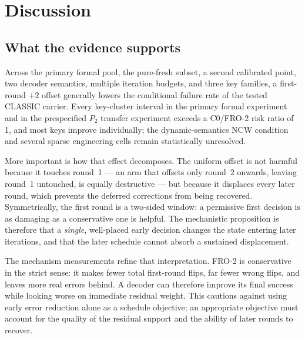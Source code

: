 \documentclass[lettersize,journal]{IEEEtran}
\begin{document}
\section{Discussion}\label{sec:discussion}

\subsection{What the evidence supports}

Across the primary formal pool, the pure-fresh subset, a second calibrated point, two decoder semantics, multiple iteration budgets, and three key families, a first-round $+2$ offset generally lowers the conditional failure rate of the tested CLASSIC carrier. Every key-cluster interval in the primary formal experiment and in the prespecified $P_2$ transfer experiment exceeds a C0/FRO-2 risk ratio of 1, and most keys improve individually; the dynamic-semantics NCW condition and several sparse engineering cells remain statistically unresolved.

More important is how that effect decomposes. The uniform offset is not harmful because it touches round~1 --- an arm that offsets only round~2 onwards, leaving round~1 untouched, is equally destructive --- but because it displaces every later round, which prevents the deferred corrections from being recovered. Symmetrically, the first round is a two-sided window: a permissive first decision is as damaging as a conservative one is helpful. The mechanistic proposition is therefore that a \emph{single}, well-placed early decision changes the state entering later iterations, and that the later schedule cannot absorb a sustained displacement.

The mechanism measurements refine that interpretation. FRO-2 is conservative in the strict sense: it makes fewer total first-round flips, far fewer wrong flips, and leaves more real errors behind. A decoder can therefore improve its final success while looking worse on immediate residual weight. This cautions against using early error reduction alone as a schedule objective; an appropriate objective must account for the quality of the residual support and the ability of later rounds to recover.
\end{document}
